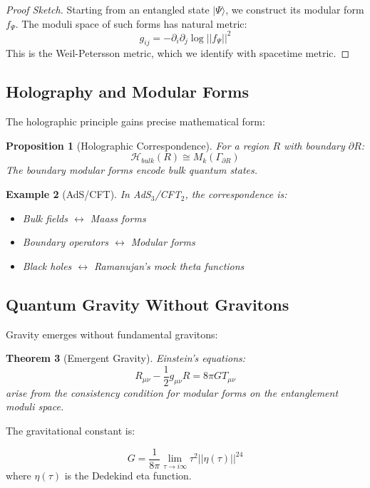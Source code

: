 \documentclass[12pt,a4paper]{article}
\newtheorem{theorem}{Theorem}[section]
\newtheorem{proposition}[theorem]{Proposition}
\newtheorem{example}[theorem]{Example}
\begin{document}
\begin{proof}[Proof Sketch]
Starting from an entangled state $|\Psi\rangle$, we construct its modular form $f_\Psi$. The moduli space of such forms has natural metric:
\[
g_{ij} = -\partial_i \partial_j \log || f_\Psi ||^2
\]
This is the Weil-Petersson metric, which we identify with spacetime metric.
\end{proof}

\subsection{Holography and Modular Forms}

The holographic principle gains precise mathematical form:

\begin{proposition}[Holographic Correspondence]
For a region $R$ with boundary $\partial R$:
\[
\mathcal{H}_{bulk}(R) \cong M_k(\Gamma_{\partial R})
\]
The boundary modular forms encode bulk quantum states.
\end{proposition}

\begin{example}[AdS/CFT]
In AdS$_3$/CFT$_2$, the correspondence is:
\begin{itemize}
\item Bulk fields $\leftrightarrow$ Maass forms
\item Boundary operators $\leftrightarrow$ Modular forms
\item Black holes $\leftrightarrow$ Ramanujan's mock theta functions
\end{itemize}
\end{example}

\subsection{Quantum Gravity Without Gravitons}

Gravity emerges without fundamental gravitons:

\begin{theorem}[Emergent Gravity]
Einstein's equations:
\[
R_{\mu\nu} - \frac{1}{2}g_{\mu\nu}R = 8\pi G T_{\mu\nu}
\]
arise from the consistency condition for modular forms on the entanglement moduli space.
\end{theorem}

The gravitational constant is:

\begin{equation}
G = \frac{1}{8\pi} \lim_{\tau \to i\infty} \tau^2 ||\eta(\tau)||^{24}
\end{equation}
where $\eta(\tau)$ is the Dedekind eta function.
\end{document}
